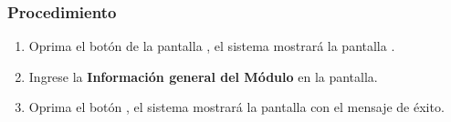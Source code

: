 \subsubsection{Procedimiento}
\begin{enumerate}
	\item Oprima el botón  de la pantalla , el sistema mostrará la pantalla . 

	
	\item Ingrese la \textbf{Información general del Módulo} en la pantalla.
	
	\item Oprima el botón , el sistema mostrará la pantalla  con el mensaje de éxito.
\end{enumerate}

